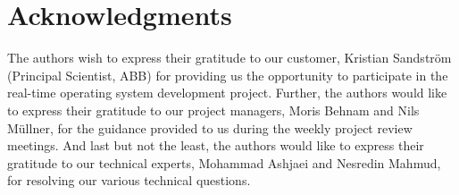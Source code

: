 \section{Acknowledgments}
The authors wish to express their gratitude to our customer, Kristian Sandström
(Principal Scientist, ABB) for providing us the opportunity to participate in
the real-time operating system development project. Further, the authors would
like to express their gratitude to our project managers, Moris Behnam and Nils
Müllner, for the guidance provided to us during the weekly project review
meetings.  And last but not the least, the authors would like to express their
gratitude to our technical experts, Mohammad Ashjaei and Nesredin Mahmud, for
resolving our various technical questions.
